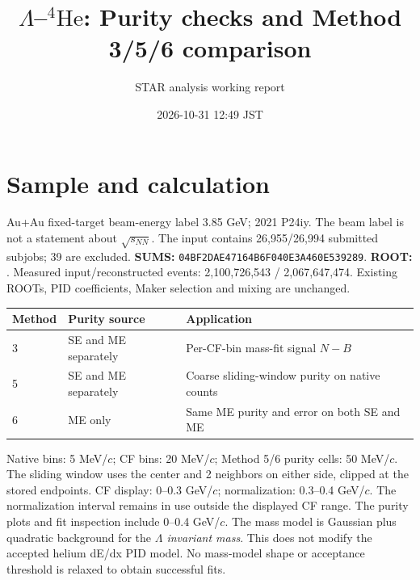 \documentclass[10pt,a4paper]{article}
\title{$\Lambda$--$^{4}\mathrm{He}$: Purity checks and Method 3/5/6 comparison}
\author{STAR analysis working report}
\date{2026-10-31 12:49 JST}
\begin{document}
\maketitle
\section{Sample and calculation}
Au+Au fixed-target beam-energy label 3.85 GeV; 2021 P24iy. The beam label is not a statement about $\sqrt{s_{NN}}$. The input contains 26,955/26,994 submitted subjobs; 39 are excluded.
\textbf{SUMS:} \texttt{04BF2DAE47164B6F040E3A460E539289}. \textbf{ROOT:} .
Measured input/reconstructed events: 2,100,726,543 / 2,067,647,474. Existing ROOTs, PID coefficients, Maker selection and mixing are unchanged.
\begin{center}\begin{tabular}{lll}\toprule Method & Purity source & Application\\\midrule
3 & SE and ME separately & Per-CF-bin mass-fit signal $N-B$\\
5 & SE and ME separately & Coarse sliding-window purity on native counts\\
6 & ME only & Same ME purity and error on both SE and ME\\\bottomrule\end{tabular}\end{center}
Native bins: 5 MeV/$c$; CF bins: 20 MeV/$c$; Method 5/6 purity cells: 50 MeV/$c$. The sliding window uses the center and 2 neighbors on either side, clipped at the stored endpoints.
CF display: 0--0.3 GeV/$c$; normalization: 0.3--0.4 GeV/$c$. The normalization interval remains in use outside the displayed CF range. The purity plots and fit inspection include 0--0.4 GeV/$c$.
The mass model is Gaussian plus quadratic background for the \emph{$\Lambda$ invariant mass}. This does not modify the accepted helium dE/dx PID model. No mass-model shape or acceptance threshold is relaxed to obtain successful fits.
\end{document}
